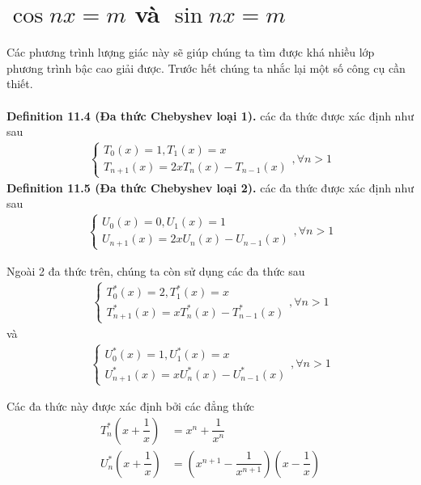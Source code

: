 \documentclass[a4paper,oneside]{book}
\numberwithin{equation}{chapter}
\begin{document}
\section{$\cos nx = m$ và $\sin nx = m$ }
Các phương trình lượng giác này sẽ giúp chúng ta tìm được khá nhiều lớp phương trình bậc cao giải được. Trước hết chúng ta nhắc lại một số công cụ cần thiết.\\
\\
\textbf{Definition 11.4 (Đa thức Chebyshev loại 1).} các đa thức được xác định như sau
\begin{align}
 \left\{ {\begin{array}{*{20}{c}}
{{T_0}\left( x \right) = 1,{T_1}\left( x \right) = x}\\
{{T_{n + 1}}\left( x \right) = 2x{T_n}\left( x \right) - {T_{n - 1}}\left( x \right)}
\end{array}} \right.,\forall n > 1
\end{align}
\textbf{Definition 11.5 (Đa thức Chebyshev loại 2).} các đa thức được xác định như sau
\begin{align}
\left\{ {\begin{array}{*{20}{c}}
{{U_0}\left( x \right) = 0,{U_1}\left( x \right) = 1}\\
{{U_{n + 1}}\left( x \right) = 2x{U_n}\left( x \right) - {U_{n - 1}}\left( x \right)}
\end{array}} \right.,\forall n > 1
\end{align}

Ngoài 2 đa thức trên, chúng ta còn sử dụng các đa thức sau 
\begin{align}
\left\{ {\begin{array}{*{20}{c}}
{T_0^*\left( x \right) = 2,T_1^*\left( x \right) = x}\\
{T_{n + 1}^*\left( x \right) = xT_n^*\left( x \right) - T_{n - 1}^*\left( x \right)}
\end{array}} \right.,\forall n > 1
\end{align}
và 
\begin{align}
\left\{ {\begin{array}{*{20}{c}}
{U_0^*\left( x \right) = 1,U_1^*\left( x \right) = x}\\
{U_{n + 1}^*\left( x \right) = xU_n^*\left( x \right) - U_{n - 1}^*\left( x \right)}
\end{array}} \right.,\forall n > 1
\end{align}

Các đa thức này được xác định bởi các đẳng thức
\begin{align}
T_n^*\left( {x + \dfrac{1}{x}} \right) &= {x^n} + \dfrac{1}{{{x^n}}}\\
U_n^*\left( {x + \dfrac{1}{x}} \right) &= \left( {{x^{n + 1}} - \dfrac{1}{{{x^{n + 1}}}}} \right)\left( {x - \dfrac{1}{x}} \right)
\end{align}
\end{document}
